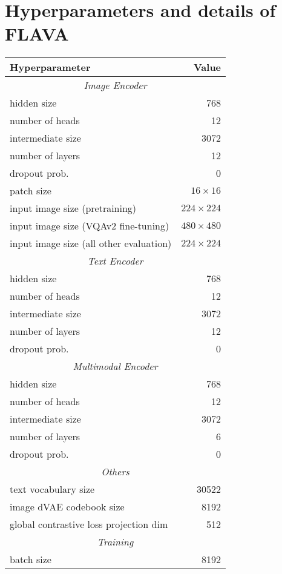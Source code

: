 \documentclass[10pt,twocolumn,letterpaper]{article}
\begin{document}
\section{Hyperparameters and details of FLAVA}

\begin{table}[b]
\small
\begin{center}
\begin{tabular}{@{}lr@{}}
\toprule
\textbf{Hyperparameter} & \textbf{Value} \\
\midrule
\multicolumn{2}{c}{\textit{Image Encoder}} \\
\midrule
hidden size & 768 \\
number of heads & 12 \\
intermediate size & 3072 \\
number of layers & 12 \\
dropout prob. & 0 \\
patch size & $16\times16$ \\
input image size (pretraining) & $224\times224$ \\
input image size (VQAv2 fine-tuning) & $480\times480$ \\
input image size (all other evaluation) & $224\times224$ \\
\midrule
\multicolumn{2}{c}{\textit{Text Encoder}} \\
\midrule
hidden size & 768 \\
number of heads & 12 \\
intermediate size & 3072 \\
number of layers & 12 \\
dropout prob. & 0 \\
\midrule
\multicolumn{2}{c}{\textit{Multimodal Encoder}} \\
\midrule
hidden size & 768 \\
number of heads & 12 \\
intermediate size & 3072 \\
number of layers & 6 \\
dropout prob. & 0 \\
\midrule
\multicolumn{2}{c}{\textit{Others}} \\
\midrule
text vocabulary size & 30522 \\
image dVAE codebook size & 8192 \\
global contrastive loss projection dim & 512 \\
\midrule
\multicolumn{2}{c}{\textit{Training}} \\
\midrule
batch size & 8192 \\

\end{tabular}
\end{center}
\end{table}
\end{document}
